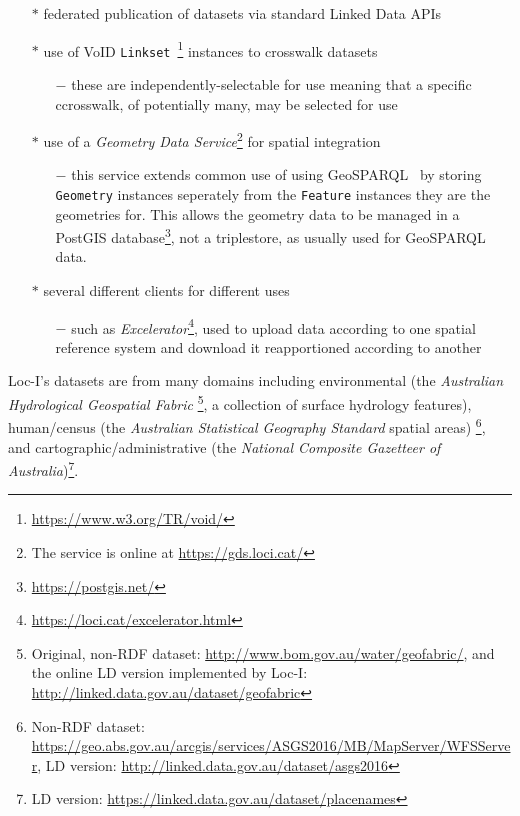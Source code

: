 \documentclass[runningheads]{llncs}
\begin{document}
\begin{itemize}
    \item[$\ast$] federated publication of datasets via standard Linked Data APIs
    \item[$\ast$] use of VoID \texttt{Linkset}~\footnote{\url{https://www.w3.org/TR/void/}} instances to crosswalk datasets
    \begin{itemize}
        \item[$-$] these are independently-selectable for use meaning that a specific ccrosswalk, of potentially many, may be selected for use
    \end{itemize} 
    \item[$\ast$] use of a \textit{Geometry Data Service}\footnote{The service is online at \url{https://gds.loci.cat/}} for spatial integration
    \begin{itemize}
        \item[$-$] this service extends common use of using GeoSPARQL~\cite{open2012ogc} by storing \texttt{Geometry} instances seperately from the \texttt{Feature} instances they are the geometries for. This allows the geometry data to be managed in a PostGIS database\footnote{\url{https://postgis.net/}}, not a triplestore, as usually used for GeoSPARQL data.
    \end{itemize}
    \item[$\ast$] several different clients for different uses
    \begin{itemize}
        \item[$-$] such as \textit{Excelerator}\footnote{\url{https://loci.cat/excelerator.html}}, used to upload data according to one spatial reference system and download it reapportioned according to another
    \end{itemize}
\end{itemize} 

Loc-I's datasets are from many domains including environmental (the \textit{Australian Hydrological Geospatial Fabric}
\footnote{Original, non-RDF dataset: \url{http://www.bom.gov.au/water/geofabric/}, and the online LD version implemented by Loc-I: \url{http://linked.data.gov.au/dataset/geofabric}}, 
a collection of surface hydrology features), human/census (the \textit{Australian Statistical Geography Standard} spatial areas)
\footnote{Non-RDF dataset: \url{https://geo.abs.gov.au/arcgis/services/ASGS2016/MB/MapServer/WFSServer}, LD version: \url{http://linked.data.gov.au/dataset/asgs2016}}, 
and cartographic/administrative (the \textit{National Composite Gazetteer of Australia})\footnote{LD version: \url{https://linked.data.gov.au/dataset/placenames}}. 
\end{document}
